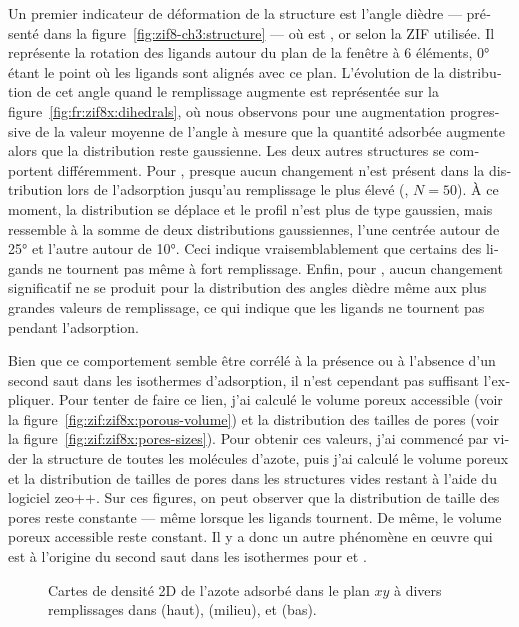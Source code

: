 \documentclass[thesis]{subfiles}
\begin{document}
\begin{otherlanguage}{french}
Un premier indicateur de déformation de la structure est l'angle dièdre
 --- présenté dans la figure~\ref{fig:zif8-ch3:structure}
--- où  est ,  or  selon la ZIF utilisée. Il
représente la rotation des ligands autour du plan de la fenêtre à 6 éléments, 0°
étant le point où les ligands sont alignés avec ce plan. L'évolution de la
distribution de cet angle quand le remplissage augmente est représentée sur la
figure~\ref{fig:fr:zif8x:dihedrals}, où nous observons pour  une
augmentation progressive de la valeur moyenne de l'angle à mesure que la
quantité adsorbée augmente alors que la distribution reste gaussienne. Les deux
autres structures se comportent différemment. Pour \ZIFCl, presque aucun
changement n'est présent dans la distribution lors de l'adsorption jusqu'au
remplissage le plus élevé (\ie, $N = 50$). À ce moment, la distribution se
déplace et le profil n'est plus de type gaussien, mais ressemble à la somme de
deux distributions gaussiennes, l'une centrée autour de 25° et l'autre autour de
10°. Ceci indique vraisemblablement que certains des ligands ne tournent pas
même à fort remplissage. Enfin, pour \ZIFBr, aucun changement significatif ne se
produit pour la distribution des angles dièdre même aux plus grandes valeurs de
remplissage, ce qui indique que les ligands ne tournent pas pendant
l'adsorption.

Bien que ce comportement semble être corrélé à la présence ou à l'absence d'un
second saut dans les isothermes d'adsorption, il n'est cependant pas suffisant
l'expliquer. Pour tenter de faire ce lien, j'ai calculé le volume poreux
accessible (voir la figure~\ref{fig:zif:zif8x:porous-volume}) et la distribution
des tailles de pores (voir la figure~\ref{fig:zif:zif8x:pores-sizes}). Pour
obtenir ces valeurs, j'ai commencé par vider la structure de toutes les
molécules d'azote, puis j'ai calculé le volume poreux et la distribution de
tailles de pores dans les structures vides restant à l'aide du logiciel
zeo++\cite{Willems2012}. Sur ces figures, on peut observer que la distribution
de taille des pores reste constante --- même lorsque les ligands tournent. De
même, le volume poreux accessible reste constant. Il y a donc un autre phénomène
en œuvre qui est à l'origine du second saut dans les isothermes pour  et
\ZIFCl.

\begin{figure}[ht]
    \centering
    
    \caption{Cartes de densité 2D de l'azote adsorbé dans le plan $xy$
    à divers remplissages dans  (haut), \ZIFCl (milieu), et \ZIFBr
    (bas).}
    \label{fig:fr:zif8x:density}
\end{figure}


\end{otherlanguage}
\end{document}
